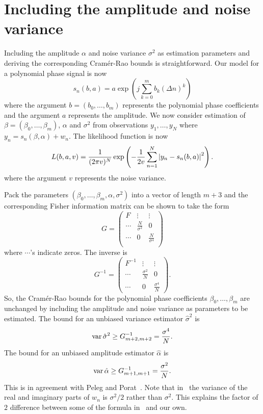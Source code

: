 \documentclass[journal,10pt]{IEEEtran}
\begin{document}
 

\section{Including the amplitude and noise variance}\label{sec:including-amplitude}

Including the amplitude $\alpha$ and noise variance $\sigma^2$ as estimation parameters and deriving the corresponding Cram\'{e}r-Rao bounds is straightforward.  Our model for a polynomial phase signal is now
\[
s_n(b,a) = a \exp\left( j \sum_{k = 0}^{m}{b_k (\Delta n)^k}\right)
\]
where the argument $b=(b_0, \dots, b_m)$ represents the polynomial phase coefficients and the argument $a$ represents the amplitude.  We now consider estimation of $\beta = (\beta_0, \dots, \beta_m)$, $\alpha$ and $\sigma^2$  from observations $y_1, \dots, y_N$ where $y_n = s_n(\beta,\alpha) + w_n$.  The likelihood function is now
\[
L(b,a,v) = \frac{1}{(2 \pi v )^N} \exp\left( - \frac{1}{2 v } \sum_{n=1}^N {\left| y_n -  s_n(b,a)  \right|}^2 \right).
\]
where the argument $v$ represents the noise variance.

Pack the parameters $(\beta_0, \dots, \beta_m,\alpha,\sigma^2)$ into a vector of length $m+3$ and the corresponding Fisher information matrix can be shown to take the form
\[
G = \left( \begin{array}{ccc}
F & \vdots & \vdots \\
\cdots & \frac{N}{\sigma^2} & 0\\
\cdots & 0 & \frac{N}{\sigma^4} \\
\end{array}\right)
\]
where $\cdots$'s indicate zeros.  The inverse is
\[
G^{-1} = \left( \begin{array}{ccc}
F^{-1} & \vdots & \vdots \\
\cdots & \frac{\sigma^2}{N} & 0 \\
\cdots & 0 & \frac{\sigma^4}{N}
\end{array} \right).
\]
So, the Cram\'{e}r-Rao bounds for the polynomial phase coefficients $\beta_0, \dots, \beta_m$ are unchanged by including the amplitude and noise variance as parameters to be estimated.  The bound for an unbiased variance estimator $\hat{\sigma}^2$ is
\[
\operatorname{var} \hat{\sigma}^2 \geq G_{m+2,m+2}^{-1} = \frac{\sigma^4}{N}.
\]
The bound for an unbiased amplitude estimator $\hat{\alpha}$ is
\[
\operatorname{var} \hat{\alpha} \geq G_{m+1,m+1}^{-1} = \frac{\sigma^2}{N}.
\]
This is in agreement with Peleg and Porat~\cite{Peleg1991_CRB_PPS_1991}.  Note that in~\cite{Peleg1991_CRB_PPS_1991} the variance of the real and imaginary parts of $w_n$ is $\sigma^2/2$ rather than $\sigma^2$.  This explains the factor of $2$ difference between some of the formula in~\cite{Peleg1991_CRB_PPS_1991} and our own.
\end{document}
